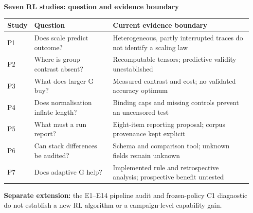 \documentclass[border=8pt]{standalone}
\begin{document}
\begin{minipage}{15.2cm}\sffamily\small
{\Large\bfseries\color{ink} Seven RL studies: question and evidence boundary}\par\medskip
\renewcommand{\arraystretch}{1.35}
\begin{tabular}{@{}p{0.8cm}p{4.5cm}p{8.8cm}@{}}\toprule
Study & Question & Current evidence boundary\\\midrule
P1 & Does scale predict outcome? & Heterogeneous, partly interrupted traces do not identify a scaling law\\
P2 & Where is group contrast absent? & Recomputable tensors; predictive validity unestablished\\
P3 & What does larger G buy? & Measured contrast and cost; no validated accuracy optimum\\
P4 & Does normalisation inflate length? & Binding caps and missing controls prevent an uncensored test\\
P5 & What must a run report? & Eight-item reporting proposal; corpus provenance kept explicit\\
P6 & Can stack differences be audited? & Schema and comparison tool; unknown fields remain unknown\\
P7 & Does adaptive G help? & Implemented rule and retrospective analysis; prospective benefit untested\\\bottomrule
\end{tabular}\par\medskip
\textbf{Separate extension:} the E1--E14 pipeline audit and frozen-policy C1 diagnostic do not establish a new RL algorithm or a campaign-level capability gain.
\end{minipage}
\end{document}
